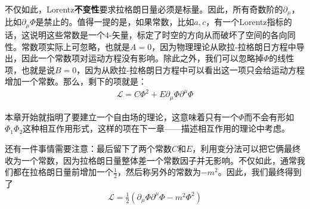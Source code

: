 不仅如此，Lorentz{\bfseries 不变性}要求拉格朗日量必须是标量。因此，所有奇数阶的$\partial_\mu$，比如$\partial_\mu\Phi$是禁止的。值得一提的是，如果常数，比如$a, c$，有一个Lorentz指标的话，这说明这些常数是一个$4$-矢量，标定了时空的方向从而破坏了空间的各向同性。常数项实际上可忽略，也就是$A=0$，因为物理理论从欧拉-拉格朗日方程中导出，因此一个常数项对运动方程没有影响。除此之外，我们可以忽略掉$\Phi$的线性项，也就是说$B=0$，因为从欧拉-拉格朗日方程中可以看出这一项只会给运动方程增加一个常数。那么，剩下的项就是：
\begin{align}
\label{equ6.3}
\mathscr{L}=C\Phi^2+E\partial_\mu\Phi\partial^\mu\Phi
\end{align}

本章开始就指明了要建立一个自由场的理论，这意味着只有一个$\Phi$而不会有形如$\Phi_1\Phi_2$这种相互作用形式，这样的项在下一章——描述相互作用的理论中考虑。

还有一件事情需要注意：最后留下了两个常数$C$和$E$，利用变分法可以把它俩最终收为一个常数，因为拉格朗日量整体差一个常数因子并无影响。不仅如此，通常我们都在拉格朗日量前增加一个$\frac{1}{2}$，然后称另外的常数为$-m^2$。因此，我们最终得到了
\begin{align}
\label{equ6.4}
\mathscr{L}=\frac{1}{2}(\partial_\mu\Phi\partial^\mu\Phi-m^2\Phi^2)
\end{align}

